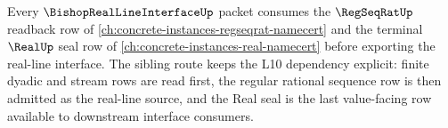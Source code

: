 Every $\BishopRealLineInterfaceUp$ packet consumes the $\RegSeqRatUp$ readback row of \autoref{ch:concrete-instances-regseqrat-namecert} and the terminal $\RealUp$ seal row of \autoref{ch:concrete-instances-real-namecert} before exporting the real-line interface. The sibling route keeps the L10 dependency explicit: finite dyadic and stream rows are read first, the regular rational sequence row is then admitted as the real-line source, and the Real seal is the last value-facing row available to downstream interface consumers.
